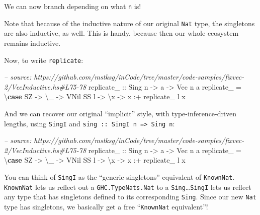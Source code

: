 \documentclass[]{article}
\newenvironment{Shaded}{}{}
\newcommand{\KeywordTok}[1]{\textcolor[rgb]{0.00,0.44,0.13}{\textbf{#1}}}
\newcommand{\DataTypeTok}[1]{\textcolor[rgb]{0.56,0.13,0.00}{#1}}
\newcommand{\CommentTok}[1]{\textcolor[rgb]{0.38,0.63,0.69}{\textit{#1}}}
\newcommand{\OtherTok}[1]{\textcolor[rgb]{0.00,0.44,0.13}{#1}}
\newcommand{\FunctionTok}[1]{\textcolor[rgb]{0.02,0.16,0.49}{#1}}
\newcommand{\NormalTok}[1]{#1}
\begin{document}
We can now branch depending on what \texttt{n} is!

Note that because of the inductive nature of our original \texttt{Nat} type, the
singletons are also inductive, as well. This is handy, because then our whole
ecosystem remains inductive.

Now, to write \texttt{replicate}:

\begin{Shaded}
\begin{Highlighting}[]
\CommentTok{-- source: https://github.com/mstksg/inCode/tree/master/code-samples/fixvec-2/VecInductive.hs#L75-78}
\OtherTok{replicate_ ::} \DataTypeTok{Sing}\NormalTok{ n }\OtherTok{->}\NormalTok{ a }\OtherTok{->} \DataTypeTok{Vec}\NormalTok{ n a}
\NormalTok{replicate_ }\FunctionTok{=}\NormalTok{ \textbackslash{}}\KeywordTok{case}
    \DataTypeTok{SZ}   \OtherTok{->}\NormalTok{ \textbackslash{}_ }\OtherTok{->} \DataTypeTok{VNil}
    \DataTypeTok{SS}\NormalTok{ l }\OtherTok{->}\NormalTok{ \textbackslash{}x }\OtherTok{->}\NormalTok{ x }\FunctionTok{:+}\NormalTok{ replicate_ l x}
\end{Highlighting}
\end{Shaded}

And we can recover our original ``implicit'' style, with type-inference-driven
lengths, using \texttt{SingI} and
\texttt{sing\ ::\ SingI\ n\ =\textgreater{}\ Sing\ n}:

\begin{Shaded}
\begin{Highlighting}[]
\CommentTok{-- source: https://github.com/mstksg/inCode/tree/master/code-samples/fixvec-2/VecInductive.hs#L75-78}
\OtherTok{replicate_ ::} \DataTypeTok{Sing}\NormalTok{ n }\OtherTok{->}\NormalTok{ a }\OtherTok{->} \DataTypeTok{Vec}\NormalTok{ n a}
\NormalTok{replicate_ }\FunctionTok{=}\NormalTok{ \textbackslash{}}\KeywordTok{case}
    \DataTypeTok{SZ}   \OtherTok{->}\NormalTok{ \textbackslash{}_ }\OtherTok{->} \DataTypeTok{VNil}
    \DataTypeTok{SS}\NormalTok{ l }\OtherTok{->}\NormalTok{ \textbackslash{}x }\OtherTok{->}\NormalTok{ x }\FunctionTok{:+}\NormalTok{ replicate_ l x}
\end{Highlighting}
\end{Shaded}

You can think of \texttt{SingI} as the ``generic singletons'' equivalent of
\texttt{KnownNat}. \texttt{KnownNat} lets us reflect out a
\texttt{GHC.TypeNats.Nat} to a \texttt{Sing}\ldots{}\texttt{SingI} lets us
reflect any type that has singletons defined to its corresponding \texttt{Sing}.
Since our new \texttt{Nat} type has singletons, we basically get a free
``\texttt{KnownNat} equivalent''!
\end{document}
